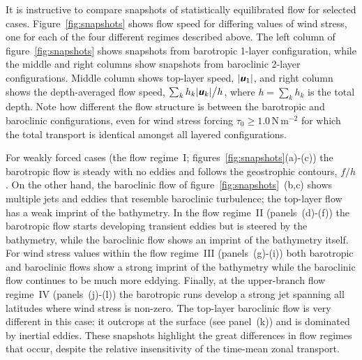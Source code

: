 \documentclass{agujournal2019}
\newcommand{\mathbfit}[1]{\textbf{\textit{\textsf{#1}}}}
\newcommand{\bu}		{\mathbfit u}
\newcommand{\Pa}		{\mathrm{N}\,\mathrm{m}^{-2}}
\begin{document}
It is instructive to compare snapshots of statistically equilibrated flow for selected cases. Figure~\ref{fig:snapshots} shows flow speed for differing values of wind stress, one for each of the four different regimes described above. The left column of figure~\ref{fig:snapshots} shows snapshots from barotropic 1-layer configuration, while the middle and right columns show snapshots from baroclinic 2-layer configurations. Middle column shows top-layer speed, $|\bu_1|$, and right column shows the depth-averaged flow speed, $\sum_k h_k|\bu_k| \big/ h$, where $h=\sum_k h_k$ is the total depth. Note how different the flow structure is between the barotropic and baroclinic configurations, even for wind stress forcing $\tau_0\ge 1.0\,\Pa$ for which the total transport is identical amongst all layered configurations.


For weakly forced cases (the flow regime~I; figures~\ref{fig:snapshots}(a)-(c)) the barotropic flow is steady with no eddies and follows the geostrophic contours, $f/h$.  On the other hand, the baroclinic flow of figure~\ref{fig:snapshots}~(b,c) shows multiple jets and eddies that resemble baroclinic turbulence; the top-layer flow has a weak imprint of the bathymetry. In the flow regime~II (panels~(d)-(f)) the barotropic flow starts developing transient eddies but is steered by the bathymetry, while the baroclinic flow shows an imprint of the bathymetry itself. For wind stress values within the flow regime~III (panels~(g)-(i)) both barotropic and baroclinic flows show a strong imprint of the bathymetry while the baroclinic flow continues to be much more eddying. Finally, at the upper-branch flow regime~IV (panels~(j)-(l)) the barotropic runs develop a strong jet spanning all latitudes where wind stress is non-zero. The top-layer baroclinic flow is very different in this case: it outcrops at the surface (see panel~(k)) and is dominated by inertial eddies. These snapshots highlight the great differences in flow regimes that occur, despite the relative insensitivity of the time-mean zonal transport.
\end{document}
